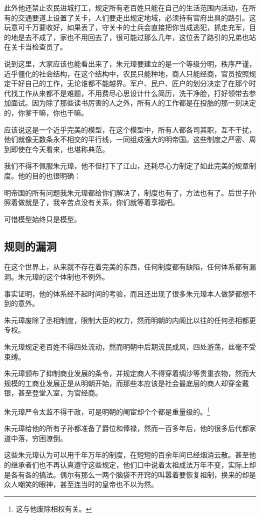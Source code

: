 \begin{multicols}{\theparacolNo}
		此外他还禁止农民进城打工，规定所有老百姓只能在自己的生活范围内活动，在所有的交通要道上设置了关卡，人们要走出规定地域，必须持有官府出具的路引。这玩意可千万要收好，如果丢了，守关卡的士兵会直接把你当成逃犯，抓走充军，目的地是去不成了，家也不用回去了，很可能过那么几年，这位丢了路引的兄弟也站在关卡当检查员了。

		说到这里，大家应该也能看出来了，朱元璋要建立的是一个等级分明，秩序严谨，近乎僵化的社会结构，在这个结构中，农民只能种地，商人只能经商，官员按照规定干好自己的工作，无论谁都不能越界。军户、民户、匠户的划分决定了在那个时代找工作从来都不是难题，不用费尽心思设计什么简历，洗干净脸，打好领带去参加面试。因为除了那些读书厉害的人之外，所有人的工作都是在投胎的那一刻决定的，你爹干嘛，你也干嘛。

		应该说这是一个近乎完美的模型，在这个模型中，所有人都各司其职，互不干扰，他们就像无数条永不相交的平行线，一同组成强大的明帝国。这些制度之严密、周到即使在今天看来，也堪称典范。

		我们不得不佩服朱元璋，他不但打下了江山，还耗尽心力制定了如此完美的规章制度。他的目的也很明确：

		明帝国的所有问题我朱元璋都给你们解决了，制度也有了，方法也有了。后世子孙照着做就是了，我辛苦点没有关系，你们就等着享福吧。

		可惜模型始终只是模型。

		\subsection{规则的漏洞}
		在这个世界上，从来就不存在着完美的东西，任何制度都有缺陷，任何体系都有漏洞。朱元璋的这个体制也不例外。

		事实证明，他的体系经不起时间的考验，而且还出现了很多朱元璋本人做梦都想不到的意外。

		朱元璋废除了丞相制度，限制大臣的权力，然而明朝的内阁比以往的任何丞相都更专权。

		朱元璋规定老百姓不得四处流动，然而明朝中后期流民成风，四处游荡，丝毫不受束缚。

		朱元璋颁布了抑制商业发展的条令，并规定商人不得穿着绸沙等贵重衣物，然而大规模的工商业发展正是从明朝开始，而那些本应该是社会最底层的商人却穿金戴银，甚至登堂入室，为官经商。

		朱元璋严令太监不得干政，可是明朝的阉宦却个个都是重量级的。\footnote{这与他废除相权有关。}

		朱元璋给他的所有子孙都准备了爵位和俸禄，然而一百多年后，他的很多后代都家道中落，穷困潦倒。

		这些朱元璋认为可以用千年万年的制度，在短短的百余年间已经烟消云散。甚至他的继承者们也不再认真遵守这些规定，他们口中说着太祖成法万年不变，实际上却是各有各的搞法。偶尔有那么一两个脑袋不开窍的叫嚣着要恢复祖制，换来的却是众人嘲笑的眼神，甚至连当时的皇帝也不以为然。


\end{multicols}
